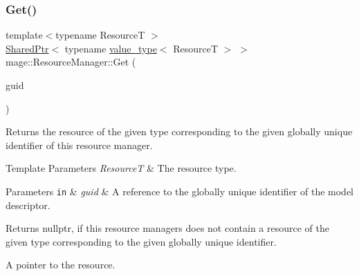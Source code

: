 \subsubsection{\texorpdfstring{Get()}{Get()}\hspace{0.1cm}{\footnotesize\ttfamily [2/2]}}
{\footnotesize\ttfamily template$<$typename ResourceT $>$ \\
\hyperlink{namespacemage_a1e01ae66713838a7a67d30e44c67703e}{Shared\+Ptr}$<$ typename \hyperlink{classmage_1_1_resource_manager_aaa3a9fe40c809cd51eda14d2322746ac}{value\+\_\+type}$<$ ResourceT $>$ $>$ mage\+::\+Resource\+Manager\+::\+Get (\begin{DoxyParamCaption}\item[{const typename \hyperlink{classmage_1_1_resource_manager_a5109dfe000a336d9fd2d467ba3dda5a1}{key\+\_\+type}$<$ ResourceT $>$ \&}]{guid }\end{DoxyParamCaption})\hspace{0.3cm}{\ttfamily [noexcept]}}

Returns the resource of the given type corresponding to the given globally unique identifier of this resource manager.


\begin{DoxyTemplParams}{Template Parameters}
{\em ResourceT} & The resource type. \\
\hline
\end{DoxyTemplParams}

\begin{DoxyParams}[1]{Parameters}
\mbox{\tt in}  & {\em guid} & A reference to the globally unique identifier of the model descriptor. \\
\hline
\end{DoxyParams}
\begin{DoxyReturn}{Returns}
{\ttfamily nullptr}, if this resource managers does not contain a resource of the given type corresponding to the given globally unique identifier. 

A pointer to the resource. 
\end{DoxyReturn}
\hypertarget{classmage_1_1_resource_manager_a9f3b13fa8eb009c55677de7a8d25dae7}{}\label{classmage_1_1_resource_manager_a9f3b13fa8eb009c55677de7a8d25dae7} 
